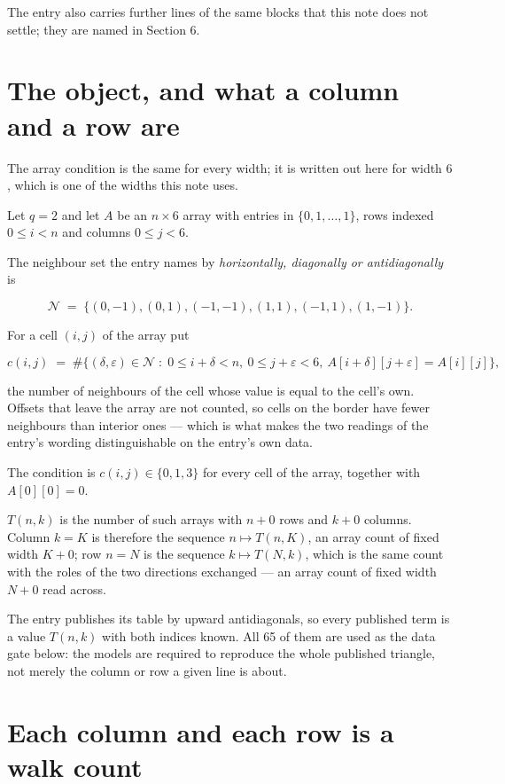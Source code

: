 \documentclass[11pt]{article}
\theoremstyle{definition}
\begin{document}
The entry also carries further lines of the same blocks that this note does not settle; they are named in Section 6.

\section{The object, and what a column and a row are}

The array condition is the same for every width; it is written out here for width $6$, which is one of the widths this note uses.

Let $q = 2$ and let $A$ be an $n \times 6$ array with entries in $\{0,1,\dots,1\}$, rows indexed $0 \le i < n$ and columns $0 \le j < 6$.

The neighbour set the entry names by {\itshape horizontally, diagonally or antidiagonally} is

\[\mathcal{N} \;=\; \{(0,-1), (0,1), (-1,-1), (1,1), (-1,1), (1,-1)\}.\]

For a cell $(i,j)$ of the array put

\[c(i,j) \;=\; \#\bigl\{(\delta,\varepsilon)\in\mathcal{N} \;:\; 0\le i+\delta<n,\ 0\le j+\varepsilon<6,\ A[i+\delta][j+\varepsilon] = A[i][j]\bigr\},\]

the number of neighbours of the cell whose value is equal to the cell's own. Offsets that leave the array are not counted, so cells on the border have fewer neighbours than interior ones --- which is what makes the two readings of the entry's wording distinguishable on the entry's own data.

The condition is $c(i,j) \in \{0, 1, 3\}$ for every cell of the array, together with $A[0][0]=0$.

$T(n,k)$ is the number of such arrays with $n + 0$ rows and $k + 0$ columns. Column $k = K$ is therefore the sequence $n \mapsto T(n,K)$, an array count of fixed width $K + 0$; row $n = N$ is the sequence $k \mapsto T(N,k)$, which is the same count with the roles of the two directions exchanged --- an array count of fixed width $N + 0$ read across.

The entry publishes its table by upward antidiagonals, so every published term is a value $T(n,k)$ with both indices known. All 65 of them are used as the data gate below: the models are required to reproduce the whole published triangle, not merely the column or row a given line is about.

\section{Each column and each row is a walk count}
\end{document}

